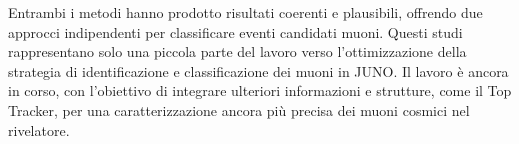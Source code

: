 Entrambi i metodi hanno prodotto risultati coerenti e plausibili, offrendo due approcci indipendenti per classificare eventi candidati muoni. Questi studi rappresentano solo una piccola parte del lavoro verso l’ottimizzazione della strategia di identificazione e classificazione dei muoni in JUNO. Il lavoro è ancora in corso, con l'obiettivo di integrare ulteriori informazioni e strutture, come il Top Tracker, per una caratterizzazione ancora più precisa dei muoni cosmici nel rivelatore.
